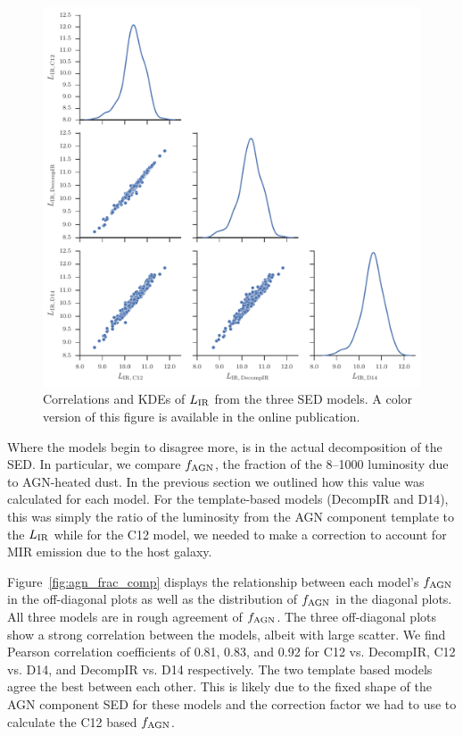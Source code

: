 \documentclass[fleqn, usenatbib]{mnras}
\begin{document}
\begin{figure}
\includegraphics[width=\textwidth]{figures/lir_total-comparison}
\caption{Correlations and KDEs of $L_{\rm IR}$ from the three SED models.  A color version of this figure is available in the online publication. \label{fig:lir_total_comp}}
\end{figure}

Where the models begin to disagree more, is in the actual decomposition of the SED. In particular, we compare $f_{\rm AGN}$, the fraction of the 8--1000 \micron{} luminosity due to AGN-heated dust. In the previous section we outlined how this value was calculated for each model. For the template-based models (DecompIR and D14), this was simply the ratio of the luminosity from the AGN component template to the $L_{\rm IR}$ while for the C12 model, we needed to make a correction to account for MIR emission due to the host galaxy. 

Figure~\ref{fig:agn_frac_comp} displays the relationship between each model's $f_{\rm AGN}$ in the off-diagonal plots as well as the distribution of $f_{\rm AGN}$ in the diagonal plots. All three models are in rough agreement of $f_{\rm AGN}$. The three off-diagonal plots show a strong correlation between the models, albeit with large scatter. We find Pearson correlation coefficients of 0.81, 0.83, and 0.92 for C12 vs. DecompIR, C12 vs. D14, and DecompIR vs. D14 respectively. The two template based models agree the best between each other. This is likely due to the fixed shape of the AGN component SED for these models and the correction factor we had to use to calculate the C12 based $f_{\rm AGN}$. 
\end{document}
